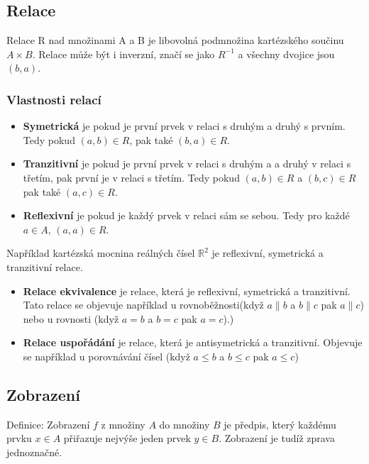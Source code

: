 \documentclass[12pt]{article}
\begin{document}
\subsection*{Relace}
Relace R nad množinami A a B je libovolná podmnožina kartézského součinu $A \times B $. Relace může být i inverzní, značí se jako $R^{-1}$ a všechny dvojice jsou $(b, a)$.

\subsubsection*{Vlastnosti relací}
\begin{itemize}[itemsep = 2pt]
    \item \textbf{Symetrická} je pokud je první prvek v relaci s druhým a druhý s prvním. Tedy pokud $(a, b) \in R$, pak také $(b, a) \in R$.
    \item \textbf{Tranzitivní} je pokud je první prvek v relaci s druhým a a druhý v relaci s třetím, pak první je v relaci s třetím. Tedy pokud $(a,b) \in R$ a $(b,c) \in R$ pak také $(a,c) \in R$. 
    \item \textbf{Reflexivní} je pokud je každý prvek v relaci sám se sebou. Tedy pro každé $a \in A$, $(a, a) \in R$.
\end{itemize}
Například kartézská mocnina reálných čísel $\mathbb{R}^2$ je reflexivní, symetrická a tranzitivní relace. 
\begin{itemize}[itemsep = 2pt]
    \item \textbf{Relace ekvivalence} je relace, která je reflexivní, symetrická a tranzitivní. Tato relace se objevuje například u rovnoběžnosti(když $a \parallel b$ a $b \parallel c$ pak $a \parallel c$) nebo u rovnosti (když $a = b$ a $b = c$ pak $a = c$).)
    \item \textbf{Relace uspořádání} je relace, která je antisymetrická a tranzitivní. Objevuje se například u porovnávání čísel (když $a \leq b$ a $b \leq c$ pak $a \leq c$)
\end{itemize}

\subsection*{Zobrazení}
Definice: Zobrazení $f$ z množiny $A$ do množiny $B$ je předpis, který každému prvku $x \in A$ přiřazuje nejvýše jeden prvek $y \in B$. Zobrazení je tudíž zprava jednoznačné. 
\end{document}
